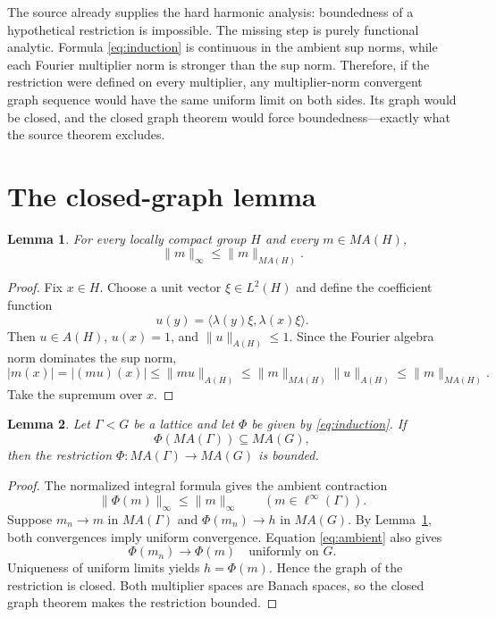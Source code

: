 \documentclass[11pt]{article}
\newtheorem{lemma}{Lemma}
\newcommand{\MA}{M\!A}
\newcommand{\norm}[1]{\lVert #1\rVert}
\begin{document}
The source already supplies the hard harmonic analysis: boundedness of a
hypothetical restriction is impossible.  The missing step is purely
functional analytic.  Formula \eqref{eq:induction} is continuous in the
ambient sup norms, while each Fourier multiplier norm is stronger than the
sup norm.  Therefore, if the restriction were defined on every multiplier,
any multiplier-norm convergent graph sequence would have the same uniform
limit on both sides.  Its graph would be closed, and the closed graph theorem
would force boundedness---exactly what the source theorem excludes.

\section{The closed-graph lemma}

\begin{lemma}\label{lem:sup}
For every locally compact group $H$ and every $m\in\MA(H)$,
\[
 \norm{m}_\infty\leq\norm{m}_{\MA(H)}.
\]
\end{lemma}

\begin{proof}
Fix $x\in H$.  Choose a unit vector $\xi\in L^2(H)$ and define the coefficient
function
\[
 u(y)=\langle\lambda(y)\xi,\lambda(x)\xi\rangle.
\]
Then $u\in A(H)$, $u(x)=1$, and $\norm{u}_{A(H)}\leq1$.  Since the Fourier
algebra norm dominates the sup norm,
\[
 |m(x)|=|(mu)(x)|\leq\norm{mu}_{A(H)}
 \leq\norm{m}_{\MA(H)}\norm{u}_{A(H)}
 \leq\norm{m}_{\MA(H)}.
\]
Take the supremum over $x$.
\end{proof}

\begin{lemma}\label{lem:closed}
Let $\Gamma<G$ be a lattice and let $\Phi$ be given by
\eqref{eq:induction}.  If
\[
 \Phi(\MA(\Gamma))\subseteq\MA(G),
\]
then the restriction $\Phi:\MA(\Gamma)\to\MA(G)$ is bounded.
\end{lemma}

\begin{proof}
The normalized integral formula gives the ambient contraction
\begin{equation}\label{eq:ambient}
 \norm{\Phi(m)}_\infty\leq\norm{m}_\infty
 \qquad(m\in\ell^\infty(\Gamma)).
\end{equation}
Suppose $m_n\to m$ in $\MA(\Gamma)$ and
$\Phi(m_n)\to h$ in $\MA(G)$.  By Lemma~\ref{lem:sup}, both convergences imply
uniform convergence.  Equation \eqref{eq:ambient} also gives
\[
 \Phi(m_n)\longrightarrow\Phi(m)
 \quad\text{uniformly on }G.
\]
Uniqueness of uniform limits yields $h=\Phi(m)$.  Hence the graph of the
restriction is closed.  Both multiplier spaces are Banach spaces, so the
closed graph theorem \cite[Theorem 2.15]{Rudin} makes the restriction bounded.
\end{proof}
\end{document}
